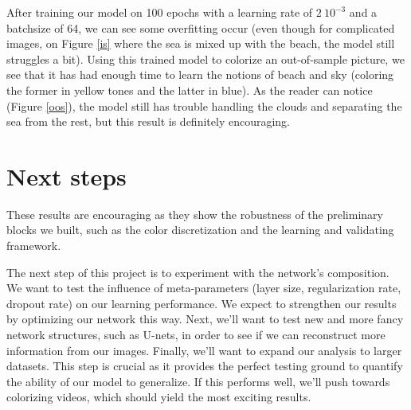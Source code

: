 \documentclass[10pt,twocolumn,letterpaper]{article}
\begin{document}
After training our model on 100 epochs with a learning rate of $2~10^{-3}$ and a batchsize of 64, we can see some overfitting occur (even though for complicated images, \eg on Figure \ref{is} where the sea is mixed up with the beach, the model still struggles a bit).
Using this trained model to colorize an out-of-sample picture, we see that it has had enough time to learn the notions of beach and sky (coloring the former in yellow tones and the latter in blue). As the reader can notice (Figure \ref{oos}), the model still has trouble handling the clouds and separating the sea from the rest, but this result is definitely encouraging.

\section{Next steps}

%											 

These results are encouraging as they show the robustness of the preliminary blocks we built, such as the color discretization and the learning and validating framework.

The next step of this project is to experiment with the network's composition. We want to test the influence of meta-parameters (layer size, regularization rate, dropout rate) on our learning performance. We expect to strengthen our results by optimizing our network this way. Next, we'll want to test new and more fancy network structures, such as U-nets, in order to see if we can reconstruct more information from our images.
Finally, we'll want to expand our analysis to larger datasets. This step is crucial as it provides the perfect testing ground to quantify the ability of our model to generalize. If this performs well, we'll push towards colorizing videos, which should yield the most exciting results.

{\small


}
\end{document}
